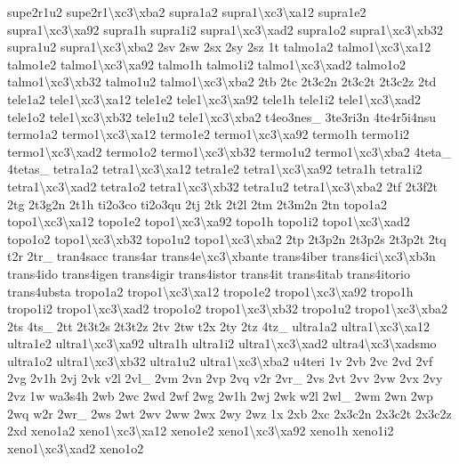 {supe2r1u2 supe2r1\textbackslash{}xc3\textbackslash{}xba2 supra1a2 supra1\textbackslash{}xc3\textbackslash{}xa12 supra1e2 supra1\textbackslash{}xc3\textbackslash{}xa92 supra1h supra1i2 supra1\textbackslash{}xc3\textbackslash{}xad2 supra1o2 supra1\textbackslash{}xc3\textbackslash{}xb32 supra1u2 supra1\textbackslash{}xc3\textbackslash{}xba2 2sv 2sw 2sx 2sy 2sz 1t talmo1a2 talmo1\textbackslash{}xc3\textbackslash{}xa12 talmo1e2 talmo1\textbackslash{}xc3\textbackslash{}xa92 talmo1h talmo1i2 talmo1\textbackslash{}xc3\textbackslash{}xad2 talmo1o2 talmo1\textbackslash{}xc3\textbackslash{}xb32 talmo1u2 talmo1\textbackslash{}xc3\textbackslash{}xba2 2tb 2tc 2t3c2n 2t3c2t 2t3c2z 2td tele1a2 tele1\textbackslash{}xc3\textbackslash{}xa12 tele1e2 tele1\textbackslash{}xc3\textbackslash{}xa92 tele1h tele1i2 tele1\textbackslash{}xc3\textbackslash{}xad2 tele1o2 tele1\textbackslash{}xc3\textbackslash{}xb32 tele1u2 tele1\textbackslash{}xc3\textbackslash{}xba2 t4eo3nes\-\_\- 3te3ri3n 4te4r5i4nsu termo1a2 termo1\textbackslash{}xc3\textbackslash{}xa12 termo1e2 termo1\textbackslash{}xc3\textbackslash{}xa92 termo1h termo1i2 termo1\textbackslash{}xc3\textbackslash{}xad2 termo1o2 termo1\textbackslash{}xc3\textbackslash{}xb32 termo1u2 termo1\textbackslash{}xc3\textbackslash{}xba2 4teta\-\_\- 4tetas\-\_\- tetra1a2 tetra1\textbackslash{}xc3\textbackslash{}xa12 tetra1e2 tetra1\textbackslash{}xc3\textbackslash{}xa92 tetra1h tetra1i2 tetra1\textbackslash{}xc3\textbackslash{}xad2 tetra1o2 tetra1\textbackslash{}xc3\textbackslash{}xb32 tetra1u2 tetra1\textbackslash{}xc3\textbackslash{}xba2 2tf 2t3f2t 2tg 2t3g2n 2t1h ti2o3co ti2o3qu 2tj 2tk 2t2l 2tm 2t3m2n 2tn topo1a2 topo1\textbackslash{}xc3\textbackslash{}xa12 topo1e2 topo1\textbackslash{}xc3\textbackslash{}xa92 topo1h topo1i2 topo1\textbackslash{}xc3\textbackslash{}xad2 topo1o2 topo1\textbackslash{}xc3\textbackslash{}xb32 topo1u2 topo1\textbackslash{}xc3\textbackslash{}xba2 2tp 2t3p2n 2t3p2s 2t3p2t 2tq t2r 2tr\-\_\- tran4sacc trans4ar trans4e\textbackslash{}xc3\textbackslash{}xbante trans4iber trans4ici\textbackslash{}xc3\textbackslash{}xb3n trans4ido trans4igen trans4igir trans4istor trans4it trans4itab trans4itorio trans4ubsta tropo1a2 tropo1\textbackslash{}xc3\textbackslash{}xa12 tropo1e2 tropo1\textbackslash{}xc3\textbackslash{}xa92 tropo1h tropo1i2 tropo1\textbackslash{}xc3\textbackslash{}xad2 tropo1o2 tropo1\textbackslash{}xc3\textbackslash{}xb32 tropo1u2 tropo1\textbackslash{}xc3\textbackslash{}xba2 2ts 4ts\-\_\- 2tt 2t3t2s 2t3t2z 2tv 2tw t2x 2ty 2tz 4tz\-\_\- ultra1a2 ultra1\textbackslash{}xc3\textbackslash{}xa12 ultra1e2 ultra1\textbackslash{}xc3\textbackslash{}xa92 ultra1h ultra1i2 ultra1\textbackslash{}xc3\textbackslash{}xad2 ultra4\textbackslash{}xc3\textbackslash{}xadsmo ultra1o2 ultra1\textbackslash{}xc3\textbackslash{}xb32 ultra1u2 ultra1\textbackslash{}xc3\textbackslash{}xba2 u4teri 1v 2vb 2vc 2vd 2vf 2vg 2v1h 2vj 2vk v2l 2vl\-\_\- 2vm 2vn 2vp 2vq v2r 2vr\-\_\- 2vs 2vt 2vv 2vw 2vx 2vy 2vz 1w wa3s4h 2wb 2wc 2wd 2wf 2wg 2w1h 2wj 2wk w2l 2wl\-\_\- 2wm 2wn 2wp 2wq w2r 2wr\-\_\- 2ws 2wt 2wv 2ww 2wx 2wy 2wz 1x 2xb 2xc 2x3c2n 2x3c2t 2x3c2z 2xd xeno1a2 xeno1\textbackslash{}xc3\textbackslash{}xa12 xeno1e2 xeno1\textbackslash{}xc3\textbackslash{}xa92 xeno1h xeno1i2 xeno1\textbackslash{}xc3\textbackslash{}xad2 xeno1o2 }

